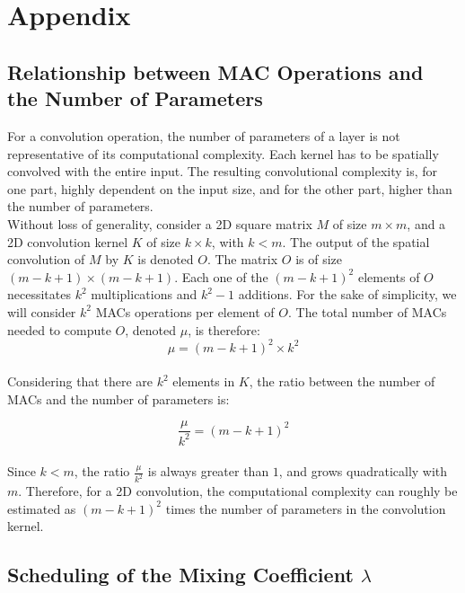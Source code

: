 \appendix

\chapter{Appendix}

\section{Relationship between \acl{MAC} Operations and the Number of Parameters}\label{sec:appendix:macs}

For a convolution operation, the number of parameters of a layer is not
representative of its computational complexity. Each kernel has to be spatially
convolved with the entire input. The resulting convolutional complexity is, for
one part, highly dependent on the input size, and for the other part, higher
than the number of parameters.\\

Without loss of generality, consider a 2D square matrix $M$ of size $m \times
m$, and a 2D convolution kernel $K$ of size $k \times k$, with $k<m$. The output
of the spatial convolution of $M$ by $K$ is denoted $O$. The matrix $O$ is of
size $(m-k+1) \times (m-k+1)$. Each one of the $(m-k+1)^2$ elements of $O$
necessitates $k^2$ multiplications and $k^2-1$ additions. For the sake of
simplicity, we will consider $k^2$ \acfp{MAC} operations per element of $O$. The
total number of \acp{MAC} needed to compute $O$, denoted $\mu$, is therefore:\\
$$
\mu = (m-k+1)^2 \times k^2
$$\\

Considering that there are $k^2$ elements in $K$, the ratio between the number
of \acp{MAC} and the number of parameters is:

$$
\frac{\mu}{k^2} = (m-k+1)^2
$$\\


Since $k<m$, the ratio $\frac{\mu}{k^2}$ is always greater than $1$, and grows
quadratically with $m$. Therefore, for a 2D convolution, the computational
complexity can roughly be estimated as $(m-k+1)^2$ times the number of
parameters in the convolution kernel.\\

\section{Scheduling of the Mixing Coefficient \texorpdfstring{$\lambda$}{lambda}}
\label{sec:appendix:annihilation}

